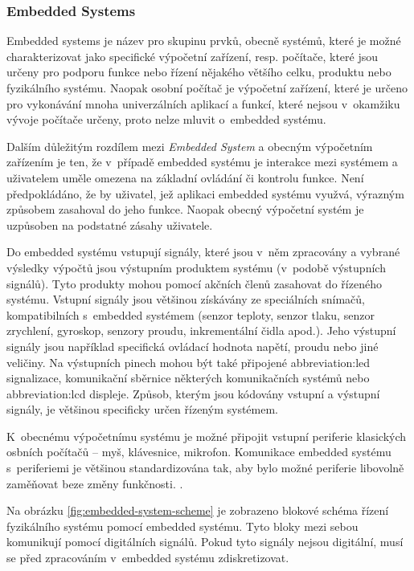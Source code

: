 \documentclass[a4paper, twoside, 11pt]{article}
\begin{document}
	\subsubsection{Embedded Systems}
	Embedded systems je název pro skupinu prvků, obecně systémů, které je možné charakterizovat jako specifické výpočetní zařízení, resp. počítače, které jsou určeny pro podporu funkce nebo řízení nějakého většího celku, produktu nebo fyzikálního systému. Naopak osobní počítač je výpočetní zařízení, které je určeno pro vykonávání mnoha univerzálních aplikací a funkcí, které nejsou v~okamžiku vývoje počítače určeny, proto nelze mluvit o~embedded systému. \cite{Sass2010}\par
	Dalším důležitým rozdílem mezi \textit{Embedded System} a obecným výpočetním zařízením je ten, že v~případě embedded systému je interakce mezi systémem a uživatelem uměle omezena na základní ovládání či kontrolu funkce. Není předpokládáno, že by uživatel, jež aplikaci embedded systému využvá, výrazným způsobem zasahoval do jeho funkce. Naopak obecný výpočetní systém je uzpůsoben na podstatné zásahy uživatele. \cite{Sass2010} \cite{juan-fpgas}\par
	Do embedded systému vstupují signály, které jsou v~něm zpracovány a vybrané výsledky výpočtů jsou výstupním produktem systému (v~podobě výstupních signálů). Tyto produkty mohou pomocí akčních členů zasahovat do řízeného systému. Vstupní signály jsou většinou získávány ze speciálních snímačů, kompatibilních s~embedded systémem (senzor teploty, senzor tlaku, senzor zrychlení, gyroskop, senzory proudu, inkrementální čidla apod.). Jeho výstupní signály jsou například specifická ovládací hodnota napětí, proudu nebo jiné veličiny. Na výstupních pinech mohou být také připojené \gls{abbreviation:led} signalizace, komunikační sběrnice některých komunikačních systémů nebo \gls{abbreviation:lcd} displeje. Způsob, kterým jsou kódovány vstupní a výstupní signály, je většinou specificky určen řízeným systémem. \cite{Sass2010}\par
	K~obecnému výpočetnímu systému je možné připojit vstupní periferie klasických osbních počítačů – myš, klávesnice, mikrofon. Komunikace embedded systému s~periferiemi je většinou standardizována tak, aby bylo možné periferie libovolně zaměňovat beze změny funkčnosti. \cite{Sass2010}.\par
	Na obrázku \ref{fig:embedded-system-scheme} je zobrazeno blokové schéma řízení fyzikálního systému pomocí embedded systému. Tyto bloky mezi sebou komunikují pomocí digitálních signálů. Pokud tyto signály nejsou digitální, musí se před zpracováním v~embedded systému zdiskretizovat.
\end{document}
